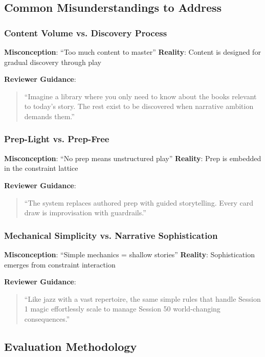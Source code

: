 \subsection{Common Misunderstandings to Address}

\subsubsection{Content Volume vs. Discovery Process}
\textbf{Misconception}: ``Too much content to master''
\textbf{Reality}: Content is designed for gradual discovery through play

\textbf{Reviewer Guidance}: 
\begin{quote}
``Imagine a library where you only need to know about the books relevant to today's story. The rest exist to be discovered when narrative ambition demands them.''
\end{quote}

\subsubsection{Prep-Light vs. Prep-Free}
\textbf{Misconception}: ``No prep means unstructured play''
\textbf{Reality}: Prep is embedded in the constraint lattice

\textbf{Reviewer Guidance}:
\begin{quote}
``The system replaces authored prep with guided storytelling. Every card draw is improvisation with guardrails.''
\end{quote}

\subsubsection{Mechanical Simplicity vs. Narrative Sophistication}
\textbf{Misconception}: ``Simple mechanics = shallow stories''
\textbf{Reality}: Sophistication emerges from constraint interaction

\textbf{Reviewer Guidance}:
\begin{quote}
``Like jazz with a vast repertoire, the same simple rules that handle Session 1 magic effortlessly scale to manage Session 50 world-changing consequences.''
\end{quote}

\subsection{Evaluation Methodology}

